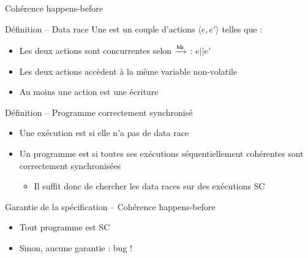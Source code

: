 
\begingroup

\begin{frame}{Cohérence happens-before}

  \begin{block}{Définition -- Data race}
    Une  est un couple d'actions $\langle e, e'\rangle$ telles que :
    \begin{itemize}
    \item Les deux actions sont concurrentes selon $\xrightarrow{\mathsf{hb}}$ : $e || e'$
    \item Les deux actions accèdent à la même variable non-volatile
    \item Au moins une action est une écriture
    \end{itemize}
  \end{block}

  
  \begin{block}{Définition -- Programme correctement synchronisé}
    \begin{itemize}
    \item Une exécution est  si elle n'a pas de data race 
    \item Un programme est  si toutes ses
      exécutions \alert{séquentiellement cohérentes} sont correctement synchronisées
      \begin{itemize}
      \item {} Il suffit donc de chercher les data races sur des exécutions SC
      \end{itemize}
    \end{itemize}
  \end{block}
  
  \begin{block}{Garantie de la spécification -- Cohérence happens-before}
    \begin{itemize}
    \item Tout programme  est SC
    \item Sinon, \alert{aucune garantie} : bug !
    \end{itemize}
  \end{block}
  
\end{frame}

\endgroup
\endinput
